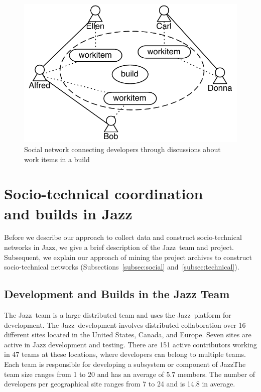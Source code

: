 \begin{figure}[t]
\centering
\includegraphics[width=.9\columnwidth]{figures/buildsn}
\caption{Social network connecting developers through discussions about
work items in a build}
\label{fig:buildsn}
\end{figure}


















\section{Socio-technical coordination\\ and builds in Jazz}
\label{sec:data}
Before we describe our approach to collect data and construct
socio-technical networks in Jazz, we give a brief
description of the Jazz\texttrademark\ team and project. Subsequent,
we explain our approach of mining the project archives to construct
socio-technical networks (Subsections~\ref{subsec:social}
and~\ref{subsec:technical}).

\subsection{Development and Builds in the Jazz Team}
The Jazz\tm\ team is a large distributed team and uses the Jazz\tm\ platform for
development. The Jazz\tm\ development involves distributed collaboration over 16
different sites located in the United States, Canada, and Europe. Seven sites are
active in Jazz development and testing. There are 151 active contributors
working in 47 teams at these locations, where developers can belong to multiple
teams. Each team is responsible for developing a subsystem or component of Jazz\tm\.
The team size ranges from 1 to 20 and has an average of 5.7 members. The number
of developers per geographical site ranges from 7 to 24 and is 14.8 in average.

